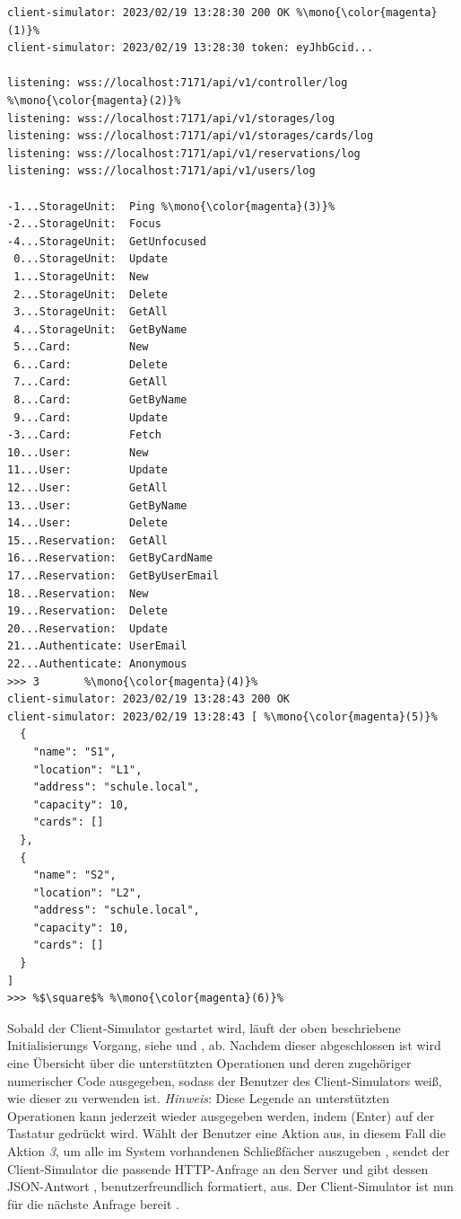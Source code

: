 \begin{lstlisting}[style=goMono, caption={Client-Simulator beim Programmstart}, label={lst:impl:simulator:client:start}]
client-simulator: 2023/02/19 13:28:30 200 OK %\mono{\color{magenta}(1)}%
client-simulator: 2023/02/19 13:28:30 token: eyJhbGcid...

listening: wss://localhost:7171/api/v1/controller/log %\mono{\color{magenta}(2)}%
listening: wss://localhost:7171/api/v1/storages/log
listening: wss://localhost:7171/api/v1/storages/cards/log
listening: wss://localhost:7171/api/v1/reservations/log
listening: wss://localhost:7171/api/v1/users/log

-1...StorageUnit:  Ping %\mono{\color{magenta}(3)}%
-2...StorageUnit:  Focus
-4...StorageUnit:  GetUnfocused
 0...StorageUnit:  Update
 1...StorageUnit:  New
 2...StorageUnit:  Delete
 3...StorageUnit:  GetAll
 4...StorageUnit:  GetByName
 5...Card:         New
 6...Card:         Delete
 7...Card:         GetAll
 8...Card:         GetByName
 9...Card:         Update
-3...Card:         Fetch
10...User:         New
11...User:         Update
12...User:         GetAll
13...User:         GetByName
14...User:         Delete
15...Reservation:  GetAll
16...Reservation:  GetByCardName
17...Reservation:  GetByUserEmail
18...Reservation:  New
19...Reservation:  Delete
20...Reservation:  Update
21...Authenticate: UserEmail
22...Authenticate: Anonymous
>>> 3       %\mono{\color{magenta}(4)}%
client-simulator: 2023/02/19 13:28:43 200 OK
client-simulator: 2023/02/19 13:28:43 [ %\mono{\color{magenta}(5)}% 
  {
    "name": "S1",
    "location": "L1",
    "address": "schule.local",
    "capacity": 10,
    "cards": []
  },
  {
    "name": "S2",
    "location": "L2",
    "address": "schule.local",
    "capacity": 10,
    "cards": []
  }
]
>>> %$\square$% %\mono{\color{magenta}(6)}%
\end{lstlisting}
Sobald der Client-Simulator gestartet wird, läuft der oben beschriebene Initialisierungs Vorgang, siehe  und , ab. Nachdem dieser abgeschlossen ist wird eine Übersicht über die unterstützten Operationen  und deren zugehöriger numerischer Code ausgegeben, sodass der Benutzer des Client-Simulators weiß, wie dieser zu verwenden ist. \textit{Hinweis}: Diese Legende an unterstützten Operationen kann jederzeit wieder ausgegeben werden, indem \keys{\return} (Enter) auf der Tastatur gedrückt wird. Wählt der Benutzer eine Aktion aus, in diesem Fall die Aktion \textit{3}, um alle im System vorhandenen Schließfächer auszugeben , sendet der Client-Simulator die passende HTTP-Anfrage an den Server und gibt dessen JSON-Antwort , benutzerfreundlich formatiert, aus. Der Client-Simulator ist nun für die nächste Anfrage bereit .

